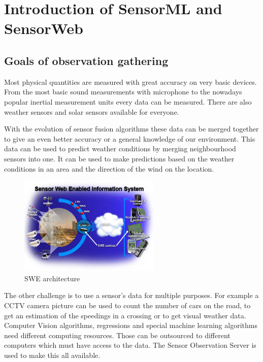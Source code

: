 \chapter{Introduction of SensorML and SensorWeb}\label{sect:Introduction}
\section{Goals of observation gathering}
Most physical quantities are measured with great accuracy on very basic devices. From the most basic sound measurements with microphone to the nowadays popular inertial measurement units every data can be measured. There are also weather sensors and solar sensors available for everyone.

 With the evolution of sensor fusion algorithms these data can be merged together to give an even better accuracy or a general knowledge of our environment. This data can be used to predict weather conditions by merging neighbourhood sensors into one. It can be used to make predictions based on the weather conditions in an area and the direction of the wind on the location.
 
 \begin{figure}[h]
 \centering
  \includegraphics[width=0.6\textwidth]{figures/webswe.png}
 \caption{SWE architecture\label{fig:webswe}}
 \end{figure}
 
 
 The other challenge is to use a sensor's data for multiple purposes. For example a CCTV camera picture can be used to count the number of cars on the road, to get an estimation of the speedings in a crossing or to get visual weather data. Computer Vision algorithms, regressions and special machine learning algorithms need different computing resources. Those can be outsourced to different computers which must have access to the data. The Sensor Observation Server is used to make this all available.
 

